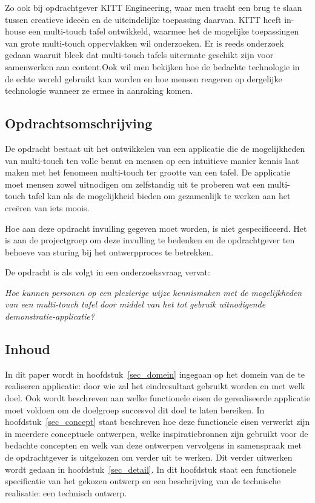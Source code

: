 \documentclass{acm}
\begin{document}
Zo ook bij opdrachtgever KITT Engineering, waar men tracht een brug te slaan tussen creatieve idee\"en en de uiteindelijke toepassing daarvan. KITT heeft in-house een multi-touch tafel ontwikkeld, waarmee het de mogelijke toepassingen van grote multi-touch oppervlakken wil onderzoeken. Er is reeds onderzoek gedaan waaruit bleek dat multi-touch tafels uitermate geschikt zijn voor samenwerken aan content.\cite{Shen}\cite{Ryall}Ook wil men bekijken hoe de bedachte technologie in de echte wereld gebruikt kan worden en hoe mensen reageren op dergelijke technologie wanneer ze ermee in aanraking komen.

\subsection{Opdrachtsomschrijving}
De opdracht bestaat uit het ontwikkelen van een applicatie die de mogelijkheden van multi-touch ten volle benut en mensen op een intu\"itieve manier kennis laat maken met het fenomeen multi-touch ter grootte van een tafel. De applicatie moet mensen zowel uitnodigen om zelfstandig uit te proberen wat een multi-touch tafel kan als de mogelijkheid bieden om gezamenlijk te werken aan het cre\"eren van iets moois.

Hoe aan deze opdracht invulling gegeven moet worden, is niet gespecificeerd. Het is aan de projectgroep om deze invulling te bedenken en de opdrachtgever ten behoeve van sturing bij het ontwerpproces te betrekken.

De opdracht is als volgt in een onderzoeksvraag vervat:

\textit{Hoe kunnen personen op een plezierige wijze kennismaken met de mogelijkheden van een multi-touch tafel door middel van het tot gebruik uitnodigende demonstratie-applicatie?}

\subsection{Inhoud}
In dit paper wordt in hoofdstuk~\ref{sec_domein} ingegaan op het domein van de te realiseren applicatie: door wie zal het eindresultaat gebruikt worden en met welk doel. Ook wordt beschreven aan welke functionele eisen de gerealiseerde applicatie moet voldoen om de doelgroep succesvol dit doel te laten bereiken. In hoofdstuk~\ref{sec_concept} staat beschreven hoe deze functionele eisen verwerkt zijn in meerdere conceptuele ontwerpen, welke inspiratiebronnen zijn gebruikt voor de bedachte concepten en welk van deze ontwerpen vervolgens in samenspraak met de opdrachtgever is uitgekozen om verder uit te werken. Dit verder uitwerken wordt gedaan in hoofdstuk~\ref{sec_detail}. In dit hoofdstuk staat een functionele specificatie van het gekozen ontwerp en een beschrijving van de technische realisatie: een technisch ontwerp.
\end{document}
